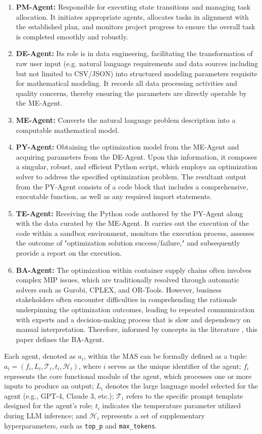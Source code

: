 \documentclass[preprint,12pt]{elsarticle}
\begin{document}
\begin{enumerate}[label=\arabic*)]
 \item \textbf{PM-Agent:} Responsible for executing state transitions and managing task allocation. It initiates appropriate agents, allocates tasks in alignment with the established plan, and monitors project progress to ensure the overall task is completed smoothly and robustly.
 \item \textbf{DE-Agent:} Its role is in data engineering, facilitating the transformation of raw user input (e.g. natural language requirements and data sources including but not limited to CSV/JSON) into structured modeling parameters requisite for mathematical modeling. It records all data processing activities and quality concerns, thereby ensuring the parameters are directly operable by the ME-Agent.
 \item \textbf{ME-Agent:} Converts the natural language problem description into a computable mathematical model.
 \item \textbf{PY-Agent:} Obtaining the optimization model from the ME-Agent and acquiring parameters from the DE-Agent. Upon this information, it composes  a singular, robust, and efficient Python script, which employs an optimization solver to address the specified optimization problem. The resultant output from the PY-Agent consists of a code block that includes a comprehensive, executable function, as well as any required import statements.
 \item \textbf{TE-Agent:} Receiving the Python code authored by the PY-Agent along with the data curated by the ME-Agent. It carries out the execution of the code within a sandbox environment, monitors the execution process, assesses the outcome of "optimization solution success/failure," and subsequently provide a report on the execution.
 \item \textbf{BA-Agent:} The optimization within container supply chains often involves complex MIP issues, which are traditionally resolved through automatic solvers such as Gurobi, CPLEX, and OR-Tools. However, business stakeholders often encounter difficulties in comprehending the rationale underpinning the optimization outcomes, leading to repeated communication with experts and a decision-making process that is slow and dependency on manual interpretation. Therefore, informed by concepts in the literature \cite{liLargeLanguageModels2023}, this paper defines the BA-Agent.
\end{enumerate}

Each agent, denoted as $a_i$, within the MAS can be formally defined as a tuple: $a_i=(f_i,L_i,\mathcal{T}_i,t_i,\mathcal{H}_i)$, where $i$ serves as the unique identifier of the agent; $f_i$ represents the core functional module of the agent, which processes one or more inputs to produce an output; $L_i$ denotes the large language model selected for the agent (e.g., GPT-4, Claude 3, etc.); $\mathcal{T}_i$ refers to the specific prompt template designed for the agent's role; $t_i$ indicates the temperature parameter utilized during LLM inference; and $\mathcal{H}_i$ represents a set of supplementary hyperparameters, such as \texttt{top\_p} and \texttt{max\_tokens}.
\end{document}
